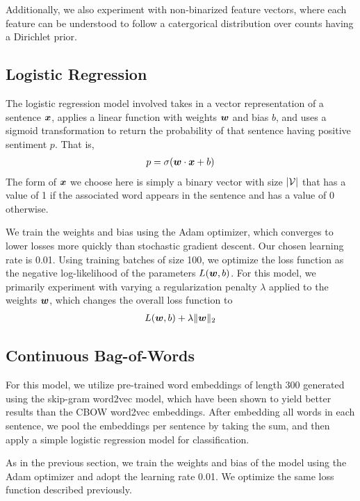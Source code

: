 \documentclass[11pt]{article}
\begin{document}
Additionally, we also experiment with non-binarized feature vectors, where each feature can be understood to follow a catergorical distribution over counts having a Dirichlet prior.

\subsection{Logistic Regression}
The logistic regression model involved takes in a vector representation of a sentence $\boldsymbol{x}$, applies a linear function with weights $\boldsymbol{w}$ and bias $b$, and uses a sigmoid transformation to return the probability of that sentence having positive sentiment $p$.  That is,
\begin{align*}
p = \sigma(\boldsymbol{w} \cdot \boldsymbol{x} + b)
\end{align*}
The form of $\boldsymbol{x}$ we choose here is simply a binary vector with size $\lvert \mathcal{V} \rvert$ that has a value of 1 if the associated word appears in the sentence and has a value of 0 otherwise.

We train the weights and bias using the Adam optimizer, which converges to lower losses more quickly than stochastic gradient descent.  Our chosen learning rate is 0.01.  Using training batches of size 100, we optimize the loss function as the negative log-likelihood of the parameters $L(\boldsymbol{w}, b)$.  For this model, we primarily experiment with varying a regularization penalty $\lambda$ applied to the weights $\boldsymbol{w}$, which changes the overall loss function to 
\begin{align*}
L(\boldsymbol{w}, b) + \lambda \| \boldsymbol{w} \|_2
\end{align*}

\subsection{Continuous Bag-of-Words}
For this model, we utilize pre-trained word embeddings of length 300 generated using the skip-gram word2vec model, which have been shown to yield better results than the CBOW word2vec embeddings. After embedding all words in each sentence, we pool the embeddings per sentence by taking the sum, and then apply a simple logistic regression model for classification. 

As in the previous section, we train the weights and bias of the model using the Adam optimizer and adopt the learning rate 0.01. We optimize the same loss function described previously.
\end{document}
